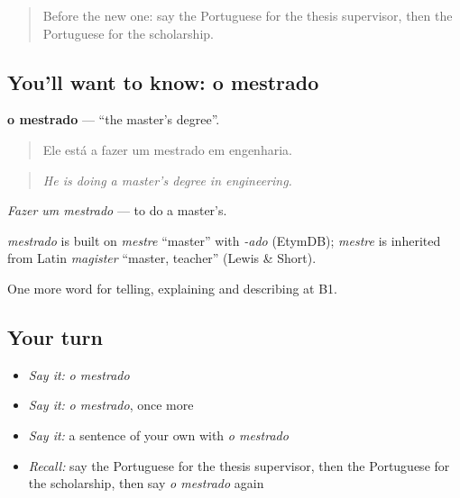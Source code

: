 \label{lesson:PT-C377-mestrado}



\begin{quote}
Before the new one: say the Portuguese for the thesis supervisor, then the Portuguese for the scholarship.
\end{quote}

\subsection*{You'll want to know: o mestrado}
\textbf{o mestrado} — \textquotedblleft{}the master's degree\textquotedblright{}.

\begin{quote}
Ele está a fazer um mestrado em engenharia.
\end{quote}

\begin{quote}
\emph{He is doing a master's degree in engineering.}
\end{quote}

\emph{Fazer um mestrado} — to do a master's.

\begin{cousinweb}
\emph{mestrado} is built on \emph{mestre} \textquotedblleft{}master\textquotedblright{} with \emph{-ado} (EtymDB); \emph{mestre} is inherited from Latin \emph{magister} \textquotedblleft{}master, teacher\textquotedblright{} (Lewis \& Short).
\end{cousinweb}

\begin{grammarlens}[title={What you've built}]
One more word for telling, explaining and describing at B1.
\end{grammarlens}

\subsection*{Your turn}
\begin{itemize}
\raggedright
  \item \emph{Say it:} \emph{o mestrado}
  \item \emph{Say it:} \emph{o mestrado}, once more
  \item \emph{Say it:} a sentence of your own with \emph{o mestrado}
  \item \emph{Recall:} say the Portuguese for the thesis supervisor, then the Portuguese for the scholarship, then say \emph{o mestrado} again
\end{itemize}


